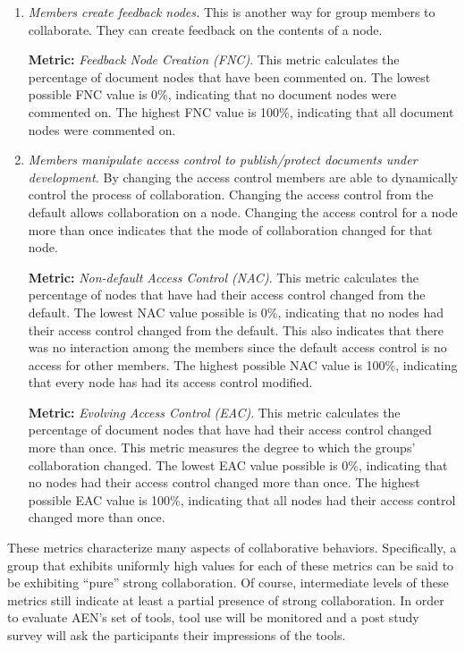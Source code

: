 \begin{enumerate}
\item{\em Members create feedback nodes.}  This is another way for group
  members to collaborate.  They can create feedback on the contents of a
  node.

  {\bf Metric:} {\em Feedback Node Creation (FNC)}.  This metric
  calculates the percentage of document nodes that have been commented
  on.  The lowest possible FNC value is 0\%, indicating that no document
  nodes were commented on.  The highest FNC value is 100\%, indicating that
  all document nodes were commented on.


\item{\em Members manipulate access control to publish/protect documents
  under development.}  By changing the access control members are able to
  dynamically control the process of collaboration.  Changing the access
  control from the default allows collaboration on a node.  Changing the
  access control for a node more than once indicates that the mode of
  collaboration changed for that node.

  {\bf Metric:} {\em Non-default Access Control (NAC)}.  This metric
  calculates the percentage of nodes that have had their access control
  changed from the default.  The lowest NAC value possible is 0\%, indicating
  that no nodes had their access control changed from the default.
  This also indicates that there was no interaction among the members
  since the default access control is no access for other members.  The
  highest possible NAC value is 100\%, indicating that every node has had its
  access control modified.

  {\bf Metric:} {\em Evolving Access Control (EAC)}.  This metric
  calculates the percentage of document nodes that have had their access
  control changed more than once. This metric measures the degree to
  which the groups' collaboration changed. The lowest EAC value possible
  is 0\%, indicating that no nodes had their access control changed more
  than once.  The highest possible EAC value is 100\%, indicating that
  all nodes had their access control changed more than once.

\end{enumerate}


These metrics characterize many aspects of collaborative behaviors.
Specifically, a group that exhibits uniformly high values for each of these
metrics can be said to be exhibiting ``pure'' strong collaboration.  Of
course, intermediate levels of these metrics still indicate at least a
partial presence of strong collaboration.  In order to evaluate
AEN's set of tools, tool use will be monitored and a post study survey will
ask the participants their impressions of the tools.

